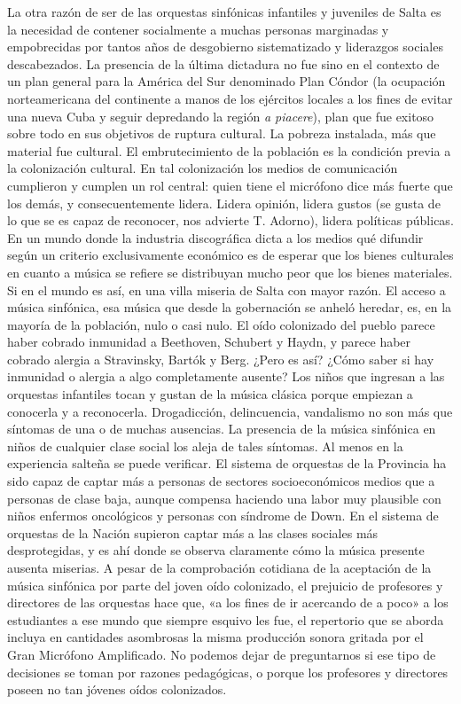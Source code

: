 La otra razón de ser de las orquestas sinfónicas infantiles y juveniles de Salta es la necesidad de contener socialmente a muchas personas marginadas y empobrecidas por tantos años de desgobierno sistematizado y liderazgos sociales descabezados. La presencia de la última dictadura no fue sino en el contexto de un plan general para la América del Sur denominado Plan Cóndor (la ocupación norteamericana del continente a manos de los ejércitos locales a los fines de evitar una nueva Cuba y seguir depredando la región \emph{a piacere}), plan que fue exitoso sobre todo en sus objetivos de ruptura cultural. La pobreza instalada, más que material fue cultural. El embrutecimiento de la población es la condición previa a la colonización cultural. En tal colonización los medios de comunicación cumplieron y cumplen un rol central: quien tiene el micrófono dice más fuerte que los demás, y consecuentemente lidera. Lidera opinión, lidera gustos (se gusta de lo que se es capaz de reconocer, nos advierte T. Adorno), lidera políticas públicas. En un mundo donde la industria discográfica dicta a los medios qué difundir según un criterio exclusivamente económico es de esperar que los bienes culturales en cuanto a música se refiere se distribuyan mucho peor que los bienes materiales. Si en el mundo es así, en una villa miseria de Salta con mayor razón. El acceso a música sinfónica, esa música que desde la gobernación se anheló heredar, es, en la mayoría de la población, nulo o casi nulo. El oído colonizado del pueblo parece haber cobrado inmunidad a Beethoven, Schubert y Haydn, y parece haber cobrado alergia a Stravinsky, Bartók y Berg. ¿Pero es así? ¿Cómo saber si hay inmunidad o alergia a algo completamente ausente? Los niños que ingresan a las orquestas infantiles tocan y gustan de la música clásica porque empiezan a conocerla y a reconocerla. Drogadicción, delincuencia, vandalismo no son más que síntomas de una o de muchas ausencias. La presencia de la música sinfónica en niños de cualquier clase social los aleja de tales síntomas. Al menos en la experiencia salteña se puede verificar. El sistema de orquestas de la Provincia ha sido capaz de captar más a personas de sectores socioeconómicos medios que a personas de clase baja, aunque compensa haciendo una labor muy plausible con niños enfermos oncológicos y personas con síndrome de Down. En el sistema de orquestas de la Nación supieron captar más a las clases sociales más desprotegidas, y es ahí donde se observa claramente cómo la música presente ausenta miserias. A pesar de la comprobación cotidiana de la aceptación de la música sinfónica por parte del joven oído colonizado, el prejuicio de profesores y directores de las orquestas hace que, «a los fines de ir acercando de a poco» a los estudiantes a ese mundo que siempre esquivo les fue, el repertorio que se aborda incluya en cantidades asombrosas la misma producción sonora gritada por el Gran Micrófono Amplificado. No podemos dejar de preguntarnos si ese tipo de decisiones se toman por razones pedagógicas, o porque los profesores y directores poseen no tan jóvenes oídos colonizados.

